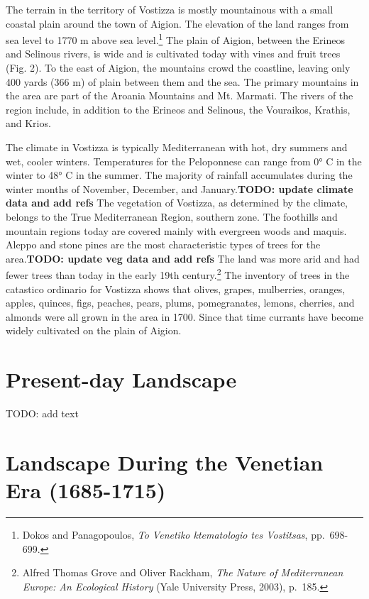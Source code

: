 \documentclass[english,]{book}
\begin{document}
The terrain in the territory of Vostizza is mostly mountainous with a small coastal plain around the town of Aigion. The elevation of the land ranges from sea level to 1770 m above sea level.\footnote{Dokos and Panagopoulos, \emph{To Venetiko ktematologio tes Vostitsas}, pp.~698-699.} The plain of Aigion, between the Erineos and Selinous rivers, is wide and is cultivated today with vines and fruit trees (Fig. 2). To the east of Aigion, the mountains crowd the coastline, leaving only 400 yards (366 m) of plain between them and the sea. The primary mountains in the area are part of the Aroania Mountains and Mt. Marmati. The rivers of the region include, in addition to the Erineos and Selinous, the Vouraikos, Krathis, and Krios.

The climate in Vostizza is typically Mediterranean with hot, dry summers and wet, cooler winters. Temperatures for the Peloponnese can range from 0° C in the winter to 48° C in the summer. The majority of rainfall accumulates during the winter months of November, December, and January.\textbf{TODO: update climate data and add refs} The vegetation of Vostizza, as determined by the climate, belongs to the True Mediterranean Region, southern zone. The foothills and mountain regions today are covered mainly with evergreen woods and maquis. Aleppo and stone pines are the most characteristic types of trees for the area.\textbf{TODO: update veg data and add refs} The land was more arid and had fewer trees than today in the early 19th century.\footnote{Alfred Thomas Grove and Oliver Rackham, \emph{The Nature of Mediterranean Europe: An Ecological History} (Yale University Press, 2003), p.~185.} The inventory of trees in the catastico ordinario for Vostizza shows that olives, grapes, mulberries, oranges, apples, quinces, figs, peaches, pears, plums, pomegranates, lemons, cherries, and almonds were all grown in the area in 1700. Since that time currants have become widely cultivated on the plain of Aigion.

\hypertarget{present-landscape}{%
\section{Present-day Landscape}\label{present-landscape}}

TODO: add text

\hypertarget{venetian-landscape}{%
\section{Landscape During the Venetian Era (1685-1715)}\label{venetian-landscape}}
\end{document}
